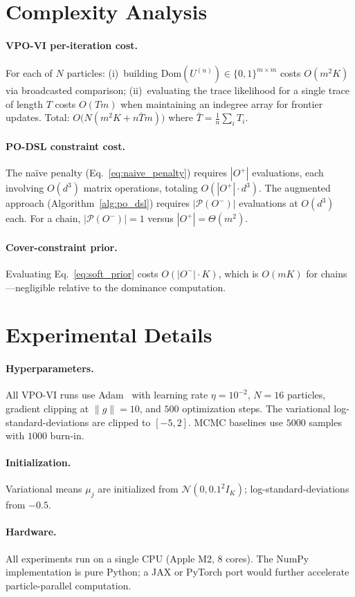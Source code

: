 \documentclass{article}
\theoremstyle{definition}
\theoremstyle{remark}
\newcommand{\Dom}{\mathrm{Dom}}
\begin{document}
\section{Complexity Analysis}
\label{app:complexity}

\paragraph{VPO-VI per-iteration cost.}
For each of $N$ particles:
(i)~building $\Dom(U^{(n)})\in\{0,1\}^{m\times m}$ costs $O(m^2 K)$
via broadcasted comparison;
(ii)~evaluating the trace likelihood for a single trace of length $T$
costs $O(Tm)$ when maintaining an indegree array for frontier updates.
Total: $O\bigl(N(m^2 K + n\bar{T}m)\bigr)$ where
$\bar{T}=\frac{1}{n}\sum_i T_i$.

\paragraph{PO-DSL constraint cost.}
The na\"ive penalty (Eq.~\ref{eq:naive_penalty}) requires
$|O^+|$ evaluations, each involving $O(d^3)$ matrix operations,
totaling $O(|O^+|\cdot d^3)$.
The augmented approach (Algorithm~\ref{alg:po_dsl}) requires
$|\mathcal{P}(O^-)|$ evaluations at $O(d^3)$ each.
For a chain, $|\mathcal{P}(O^-)|=1$ versus $|O^+|=\Theta(m^2)$.

\paragraph{Cover-constraint prior.}
Evaluating Eq.~\eqref{eq:soft_prior} costs $O(|O^-|\cdot K)$, which is
$O(mK)$ for chains---negligible relative to the dominance computation.

\section{Experimental Details}
\label{app:exp_details}

\paragraph{Hyperparameters.}
All VPO-VI runs use Adam~\citep{kingma2014adam} with learning rate
$\eta=10^{-2}$, $N=16$ particles, gradient clipping at $\|\hat g\|=10$,
and $500$ optimization steps.
The variational log-standard-deviations are clipped to $[-5,2]$.
MCMC baselines use $5000$ samples with $1000$ burn-in.

\paragraph{Initialization.}
Variational means $\mu_j$ are initialized from
$\mathcal{N}(0,0.1^2 I_K)$; log-standard-deviations from $-0.5$.

\paragraph{Hardware.}
All experiments run on a single CPU (Apple M2, 8 cores).
The NumPy implementation is pure Python; a JAX or PyTorch port
would further accelerate particle-parallel computation.
\end{document}
